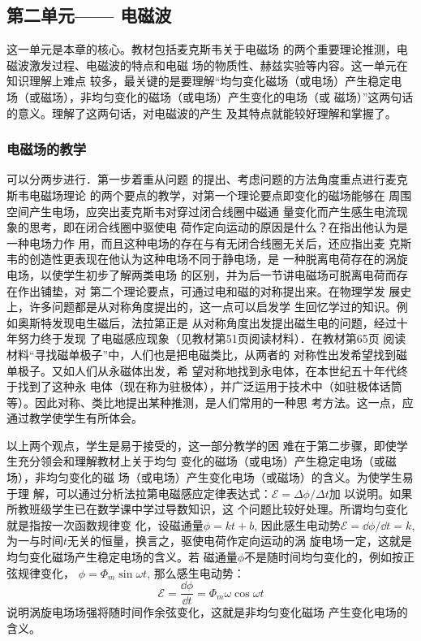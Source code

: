 \subsection{第二单元—— 电磁波}
这一单元是本章的核心。教材包括麦克斯韦关于电磁场
的两个重要理论推测，电磁波激发过程、电磁波的特点和电磁
场的物质性、赫兹实验等内容。这一单元在知识理解上难点
较多，最关键的是要理解“均匀变化磁场（或电场）产生稳定电
场（或磁场），非均匀变化的磁场（或电场）产生变化的电场（或
磁场）”这两句话的意义。理解了这两句话，对电磁波的产生
及其特点就能较好理解和掌握了。

\subsubsection{电磁场的教学}

可以分两步进行．第一步着重从问题
的提出、考虑问题的方法角度重点进行麦克斯韦电磁场理论
的两个要点的教学，对第一个理论要点即变化的磁场能够在
周围空间产生电场，应突出麦克斯韦对穿过闭合线圈中磁通
量变化而产生感生电流现象的思考，即在闭合线圈中驱使电
荷作定向运动的原因是什么？在指出他认为是一种电场力作
用，而且这种电场的存在与有无闭合线圈无关后，还应指出麦
克斯韦的创造性更表现在他认为这种电场不同于静电场，是
一种脱离电荷存在的涡旋电场，以使学生初步了解两类电场
的区别，并为后一节讲电磁场可脱离电荷而存在作出铺垫，对
第二个理论要点，可通过电和磁的对称提出来。在物理学发
展史上，许多问题都是从对称角度提出的，这一点可以启发学
生回忆学过的知识。例如奥斯特发现电生磁后，法拉第正是
从对称角度出发提出磁生电的问题，经过十年努力终于发现
了电磁感应现象（见教材第51页阅读材料）．在教材第65页
阅读材料“寻找磁单极子”中，人们也是把电磁类比，从两者的
对称性出发希望找到磁单极子。又如人们从永磁体出发，希
望对称地找到永电体，在本世纪五十年代终于找到了这种永
电体（现在称为驻极体），并广泛运用于技术中（如驻极体话筒
等）。因此对称、类比地提出某种推测，是人们常用的一种思
考方法。这一点，应通过教学使学生有所体会。

以上两个观点，学生是易于接受的，这一部分教学的困
难在于第二步骤，即使学生充分领会和理解教材上关于均匀
变化的磁场（或电场）产生稳定电场（或磁场），非均匀变化的磁
场（或电场）产生变化电场（或磁场）的含义。为使学生易于理
解，可以通过分析法拉第电磁感应定律表达式：$\mathcal{E}=\Delta \phi/\Delta t$加
以说明。如果所教班级学生已在数学课中学过导数知识，这
个问题比较好处理。所谓均匀变化就是指按一次函数规律变
化，设磁通量$\phi=kt+b$, 因此感生电动势$\mathcal{E}=\dd\phi/\dd t=k$, 为一与时间$t$无关的恒量，换言之，驱使电荷作定向运动的涡
旋电场一定，这就是均匀变化磁场产生稳定电场的含义。若
磁通量$\phi$不是随时间均匀变化的，例如按正弦规律变化，
$\phi=\Phi_m \sin\omega t$, 那么感生电动势：
\[\mathcal{E}=\frac{\dd\phi}{\dd t}=\Phi_m \omega \cos \omega t\]
说明涡旋电场场强将随时间作余弦变化，这就是非均匀变化磁场
产生变化电场的含义。

